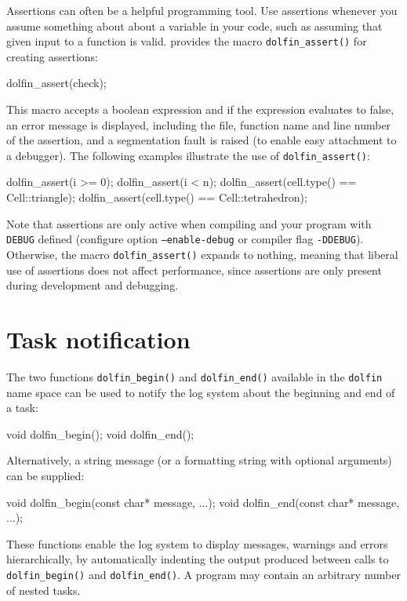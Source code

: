 Assertions can often be a helpful programming tool. Use assertions
whenever you assume something about about a variable in your code,
such as assuming that given input to a function is valid. \dolfin{}
provides the macro \texttt{dolfin\_assert()} for creating assertions:
\begin{code}
  dolfin\_assert(check);
\end{code}
This macro accepts a boolean expression and if the expression
evaluates to false, an error message is displayed, including the
file, function name and line number of the assertion, and a
segmentation fault is raised (to enable easy attachment to a
debugger). The following examples illustrate the use of
\texttt{dolfin\_assert()}:
\begin{code}
  dolfin_assert(i >= 0);
  dolfin_assert(i < n);
  dolfin_assert(cell.type() == Cell::triangle);
  dolfin_assert(cell.type() == Cell::tetrahedron);
\end{code}
Note that assertions are only active when compiling
\dolfin{} and your program with \texttt{DEBUG} defined (configure
option \texttt{--enable-debug} or compiler flag \texttt{-DDEBUG}).
Otherwise, the macro \texttt{dolfin\_assert()} expands to nothing,
meaning that liberal use of assertions does not affect performance,
since assertions are only present during development and
debugging.

\section{Task notification}

The two functions \texttt{dolfin\_begin()} and \texttt{dolfin\_end()}
available in the \texttt{dolfin} name space can be used to notify the
\dolfin{} log system about the beginning and end of a task:
\begin{code}
  void dolfin_begin();
  void dolfin_end();
\end{code}
Alternatively, a string message (or a formatting string with optional
arguments) can be supplied:
\begin{code}
  void dolfin_begin(const char* message, ...);
  void dolfin_end(const char* message, ...);
\end{code}

These functions enable the \dolfin{} log system to display messages,
warnings and errors hierarchically, by automatically indenting the
output produced between calls to \texttt{dolfin\_begin()} and
\texttt{dolfin\_end()}. A program may contain an arbitrary number of
nested tasks.

